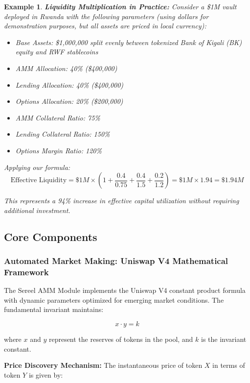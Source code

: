 \documentclass[12pt]{article}
\newtheorem{example}{Example}
\begin{document}
\begin{example}
\textbf{Liquidity Multiplication in Practice:} Consider a \$1M vault deployed in Rwanda with the following parameters (using dollars for demonstration purposes, but all assets are priced in local currency):

\begin{itemize}
  \item Base Assets: \$1,000,000 split evenly between tokenized Bank of Kigali (BK) equity and RWF stablecoins
  \item AMM Allocation: 40\% (\$400,000)
  \item Lending Allocation: 40\% (\$400,000)
  \item Options Allocation: 20\% (\$200,000)
  \item AMM Collateral Ratio: 75\%
  \item Lending Collateral Ratio: 150\%
  \item Options Margin Ratio: 120\%
\end{itemize}

Applying our formula:
$$\text{Effective Liquidity} = \$1M \times \left(1 + \frac{0.4}{0.75} + \frac{0.4}{1.5} + \frac{0.2}{1.2}\right) = \$1M \times 1.94 = \$1.94M$$

This represents a 94\% increase in effective capital utilization without requiring additional investment.
\end{example}

\subsection{Core Components}

\subsubsection{Automated Market Making: Uniswap V4 Mathematical Framework}

The Sereel AMM Module implements the Uniswap V4 constant product formula \citep{uniswapv4whitepaper} with dynamic parameters optimized for emerging market conditions. The fundamental invariant maintains:

\begin{equation}
x \cdot y = k
\end{equation}

where $x$ and $y$ represent the reserves of tokens in the pool, and $k$ is the invariant constant.

\textbf{Price Discovery Mechanism:}
The instantaneous price of token $X$ in terms of token $Y$ is given by:
\end{document}
